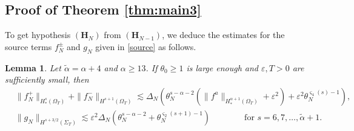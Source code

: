 \documentclass[twoside,11pt]{article}
\numberwithin{equation}{section}
\newtheorem{lemma}{Lemma}[section]
\begin{document}
\subsection{Proof of Theorem \ref{thm:main3}}
To get hypothesis $(\mathbf{H}_{{N}})$ from $(\mathbf{H}_{{N}-1})$,
we deduce the estimates for the source terms $f_{{N}}^{\pm}$ and $g_{{N}} $ given in \eqref{source} as follows.
\begin{lemma} \label{lem:source}
	Let $\widetilde{\alpha}={\alpha }+4$ and ${\alpha }\geq 13$.
	If $\theta_0\geq 1$ is large enough and $\varepsilon,T>0$ are sufficiently small, then
	\begin{align}
		&
		\|f_{{N}}^+\|_{H_*^s(\Omega_{T})}+\|f_{{N}}^-\|_{H^{s+1}(\Omega_{T})}
		\lesssim \varDelta_{{N}}\left(\theta_{{N}}^{s-{\alpha }-2} (\|f^a\|_{H_*^{\alpha+1}(\Omega_{T})}
		+\varepsilon^2 )  +\varepsilon^2\theta_{{N}}^{\varsigma_4(s)-1}\right),
		\nonumber \\[0.5mm] %
		&
		\| g_{{N}} \|_{H^{s+3/2}(\Sigma_{T}) }
		\lesssim  \varepsilon^2 \varDelta_{{N}}\left(\theta_{{N}}^{s-{\alpha }-2}
		+\theta_{{N}}^{\varsigma_2(s+1)-1}\right)\nonumber
		\qquad\qquad \textrm{for }s=6,7,\ldots,\widetilde{\alpha}+1.
	\end{align}
\end{lemma}
\end{document}
